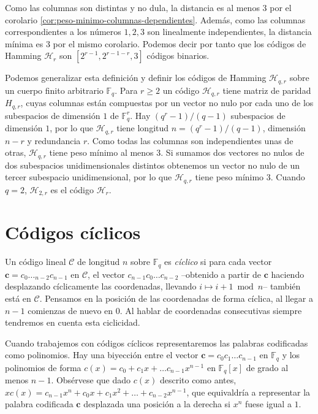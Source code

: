 Como las columnas son distintas y no dula, la distancia es al menos \(3\) por el corolario \ref{cor:peso-minimo-columnas-dependientes}.
Además, como las columnas correspondientes a los números \(1, 2, 3\) son linealmente independientes, la distancia mínima es 3 por el mismo corolario.
Podemos decir por tanto que los códigos de Hamming \(\mathcal H_r\) son \([2^{r-1}, 2^{r-1-r}, 3]\) códigos binarios.

Podemos generalizar esta definición y definir los códigos de Hamming \(\mathcal H_{q,r}\) sobre un cuerpo finito arbitrario \(\mathbb F_q\). 
Para \(r \geq 2\) un código \(\mathcal H_{q,r}\) tiene matriz de paridad \(H_{q,r}\), cuyas columnas están compuestas por un vector no nulo por cada uno de los subespacios de dimensión \(1\) de \(\mathbb F_q^r\).
Hay \((q^r-1)/(q-1)\) subespacios de dimensión \(1\), por lo que \(\mathcal H_{q,r}\) tiene longitud \(n = (q^r-1)/(q-1)\), dimensión \(n-r\) y redundancia \(r\).
Como todas las columnas son independientes unas de otras, \(\mathcal H_{q,r}\) tiene peso mínimo al menos 3.
Si sumamos dos vectores no nulos de dos subespacios unidimensionales distintos obtenemos un vector no nulo de un tercer subespacio unidimensional, por lo que \(\mathcal H_{q,r}\) tiene peso mínimo 3. 
Cuando \(q = 2\), \(\mathcal H_{2,r}\) es el código \(\mathcal H_r\).


\section{Códigos cíclicos}

Un código lineal \(\mathcal C\) de longitud \(n\) sobre \(\mathbb F_q\) es \textit{cíclico} si para cada vector \(\boldsymbol c = c_0\dotsc_{n-2}c_{n-1}\) en \(\mathcal C\), el vector \(c_{n-1}c_0\dots c_{n-2}\) --obtenido a partir de \(\boldsymbol c\) haciendo desplazando cíclicamente las coordenadas, llevando \(i \mapsto i +1 \bmod n\)-- también está en \(\mathcal C\).
Pensamos en la posición de las coordenadas de forma cíclica, al llegar a \(n -1\) comienzas de nuevo en \(0\).
Al hablar de coordenadas consecutivas siempre tendremos en cuenta esta ciclicidad.


Cuando trabajemos con códigos cíclicos representaremos las palabras codificadas como polinomios.
Hay una biyección entre el vector \(\boldsymbol c = c_0c_1\dots c_{n-1}\) en \(\mathbb F_q\) y los polinomios de forma \(c(x) = c_0 + c_1x + \dots c_{n-1}x^{n-1}\) en \(\mathbb F_q[x]\) de grado al menos \(n-1\).
Obsérvese que dado \(c(x)\) descrito como antes, \(xc(x) = c_{n-1}x^n + c_0x + c_1x^2 + \dots + c_{n-2}x^{n-1}\), que equivaldría a representar la palabra codificada \(\boldsymbol c\) desplazada una posición a la derecha si \(x^n\) fuese igual a \(1\).


